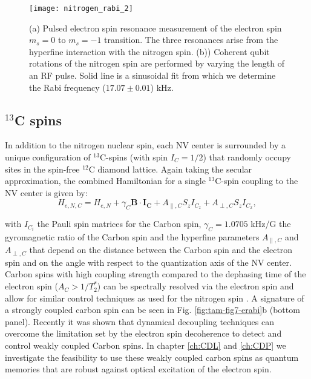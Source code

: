 \begin{figure*}
	\centering
	\texttt{[image: nitrogen\_rabi\_2]}
	\caption{\label{fig:tam-fig10-nrabi} \textbf{} (a) Pulsed electron spin resonance measurement of the electron spin $m_s = 0$ to $m_s = -1$ transition. The three resonances arise from the hyperfine interaction with the nitrogen spin. (b)) Coherent qubit rotations of the nitrogen spin are performed by varying the length of an RF pulse. Solid line is a sinusoidal fit from which we determine the Rabi frequency ($17.07 \pm 0.01$) kHz.}
\end{figure*}

\subsection{$^{13}$C spins}
In addition to the nitrogen nuclear spin, each NV center is surrounded by a unique configuration of $^{13}$C-spins (with spin $I_C = 1/2$) that randomly occupy sites in the spin-free $^{12}$C diamond lattice. Again taking the secular approximation, the combined Hamiltonian for a single $^{13}$C-spin coupling to the NV center is given by:
\begin{equation}
H_{e,N,C} = H_{e,N} + \gamma_C \mathbf{B} \cdot \mathbf{I_C} + A_{\parallel,C} S_z I_{C_z} + A_{\perp,C} S_z I_{C_x},
\end{equation}

with $I_{C_i}$ the Pauli spin matrices for the Carbon spin, $\gamma_C = 1.0705$ kHz/G the gyromagnetic ratio of the Carbon spin and the hyperfine parameters $A_{\parallel,C}$ and $A_{\perp,C}$ that depend on the distance between the Carbon spin and the electron spin and on the angle with respect to the quantization axis of the NV center. Carbon spins with high coupling strength compared to the dephasing time of the electron spin ($A_C > 1/T_2^*$) can be spectrally resolved via the electron spin and allow for similar control techniques as used for the nitrogen spin \cite{Jelezko_Phys.Rev.Lett._2004,Dutt_Science_2007,Neumann_Science_2008,Jiang_Science_2009,Smeltzer_Phys.Rev.A_2009}. A signature of a strongly coupled carbon spin can be seen in Fig. \ref{fig:tam-fig7-erabi}b (bottom panel). Recently it was shown that dynamical decoupling techniques can overcome the limitation set by the electron spin decoherence to detect\cite{Taminiau_Phys.Rev.Lett._2012,Kolkowitz_Phys.Rev.Lett._2012,Zhao_NatNano_2012} and control\cite{Taminiau_NatNano_2014} weakly coupled Carbon spins. In chapter \ref{ch:CDL} and \ref{ch:CDP} we investigate the feasibility to use these weakly coupled carbon spins as quantum memories that are robust against optical excitation of the electron spin.

